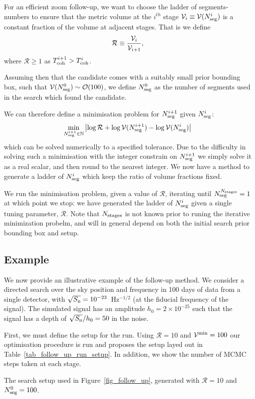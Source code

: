 \documentclass[aps, prd, twocolumn, superscriptaddress, floatfix, showpacs, nofootinbib, longbibliography]{revtex4-1}
\begin{document}
For an efficient zoom follow-up, we want to choose the ladder of
segments-numbers to ensure that
the metric volume at the $i^{th}$ stage $\mathcal{V}_i \equiv \mathcal{V}(N_{\rm seg}^i)$ is a constant
fraction of the volume at adjacent stages. That is we define
\begin{equation}
\mathcal{R} \equiv \frac{\mathcal{V}_i}{\mathcal{V}_{i+1}},
\end{equation}
where $\mathcal{R} \ge 1$ as $T_{\rm coh}^{i+1} > T_{\rm coh}^{i}$.

Assuming then that the candidate comes with a suitably small prior bounding box,
such that $\mathcal{V}(N_{\rm seg}^{0}) \sim \mathcal{O}(100)$, we define $N_{\rm seg}^0$ as the
number of segments used in the search which found the candidate.

We can therefore define a minimisation problem for $N_{\rm seg}^{i+1}$ given $N_{\rm seg}^{i}$:
\begin{align}
\min_{N_{\rm seg}^{i+1} \in \mathbb{N}}
\left| \log\mathcal{R} + \log\mathcal{V}(N_{\rm seg}^{i+1}) - \log\mathcal{V}(N_{\rm seg}^i)\right|
\end{align}
which can be solved numerically to a specified tolerance. Due to the difficulty
in solving such a minimisation with the integer constrain on $N_{\rm seg}^{i+1}$ we
simply solve it as a real scalar, and then round to the nearest integer. We now
have a method to generate a ladder of $N_{\rm seg}^{i}$ which keep the ratio of
volume fractions fixed.

We run the minimisation problem, given a value of $\mathcal{R}$, iterating
until $N_{\rm seg}^{N_{\rm stages}} = 1$ at which point we stop: we have generated the
ladder of $N_{\rm seg}^i$ given a single tuning parameter, $\mathcal{R}$. Note that
$N_{\rm stages}$ is not known prior to runing the iterative minimization probelm, and
will in general depend on both the initial search prior bounding box and setup.

\subsection{Example}

We now provide an illustrative example of the follow-up method. We consider a
directed search over the sky position and frequency in 100 days of data from a
single detector, with $\sqrt{S_{\rm n}}=10^{-23}$~Hz$^{-1/2}$ (at the fiducial
frequency of the signal). The simulated signal has an amplitude
$h_0=2\times10^{-25}$ such that the signal has a depth of $\sqrt{S_{\rm n}}/h_0=50$
in the noise.

First, we must define the setup for the run. Using $\mathcal{R}=10$ and
$\mathcal{V}^{\rm min}=100$ our optimisation procedure is run and proposes the setup
layed out in Table~\ref{tab_follow_up_run_setup}. In addition, we show the
number of MCMC steps taken at each stage.
\begin{table}[htb]
\caption{The search setup used in Figure~\ref{fig_follow_up}, generated with
$\mathcal{R}=10$ and $N_{\rm seg}^0=100$.}
\label{tab_follow_up_run_setup}

\end{table}
\end{document}
